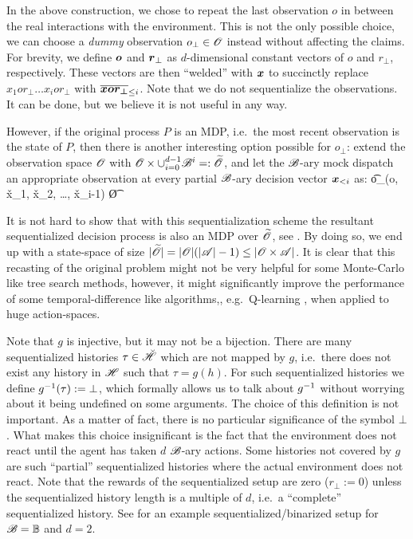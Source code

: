 \documentclass{article} %
\begin{document}
In the above construction, we chose to repeat the last observation $o$ in between the real interactions with the environment. This is not the only possible choice, we can choose a \emph{dummy} observation $o_\bot \in \mathscr{O}$ instead without affecting the claims. For brevity, we define $\boldsymbol{o}$ and $\boldsymbol{r}_\bot$ as $d$-dimensional constant vectors of $o$ and $r_\bot$, respectively. These vectors are then ``welded'' with $\boldsymbol{x}$ to succinctly replace $x_1or_\bot\dots x_ior_\bot$ with $\boldsymbol{\overline{xor_\bot}}_{\leq i}$. Note that we do not sequentialize the observations. It can be done, but we believe it is not useful in any way.

However, if the original process $P$ is an MDP, i.e.\ the most recent observation is the state of $P$, then there is another interesting option possible for $o_\bot$: extend the observation space $\mathscr{O}$ with $\mathscr{O} \times \cup_{i=0}^{d-1} \mathscr{B}^{i} =: \widetilde{\mathscr{O}}$, and let the $\mathscr{B}$-ary mock dispatch an appropriate observation at every partial $\mathscr{B}$-ary decision vector $\boldsymbol{x}_{<i}$ as:
\beq\label{eq:tobs}
\t o_\bot \coloneqq (o, \v x_1, \v x_2, \dots, \v x_{i-1}) \in \t \O
\eeq

It is not hard to show that with this sequentialization scheme the resultant sequentialized decision process is also an MDP over $\widetilde{\mathscr{O}}$, see .
By doing so, we end up with a state-space of size $|\widetilde{\mathscr{O}}| = {\left\lvert\mathscr{O}\right\rvert}({\left\lvert\mathscr{A}\right\rvert}-1) \leq {\left\lvert\mathscr{O}\times \mathscr{A}\right\rvert}$. It is clear that this recasting of the original problem might not be very helpful for some Monte-Carlo like tree search methods, however, it might significantly improve the performance of some temporal-difference like algorithms,, e.g.\ Q-learning \cite{Watkins1992}, when applied to huge action-spaces.

Note that $g$ is injective, but it may not be a bijection. There are many sequentialized histories $\tau \in \breve{\mathscr{H}}$ which are not mapped by $g$, i.e.\ there does not exist any history in $\mathscr{H}$ such that $\tau = g(h)$. For such sequentialized histories we define $g^{-1}(\tau) := \bot$, which formally allows us to talk about $g^{-1}$ without worrying about it being undefined on some arguments. The choice of this definition is not important. As a matter of fact, there is no particular significance of the symbol $\bot$. What makes this choice insignificant is the fact that the environment does not react until the agent has taken $d$ $\mathscr{B}$-ary actions. Some histories not covered by $g$ are such ``partial'' sequentialized histories where the actual environment does not react. Note that the rewards of the sequentialized setup are zero ($r_\bot := 0$) unless the sequentialized history length is a multiple of $d$, i.e.\ a ``complete'' sequentialized history. See  for an example sequentialized/binarized setup for $\mathscr{B} = \mathbb{B}$ and $d=2$.
\end{document}

